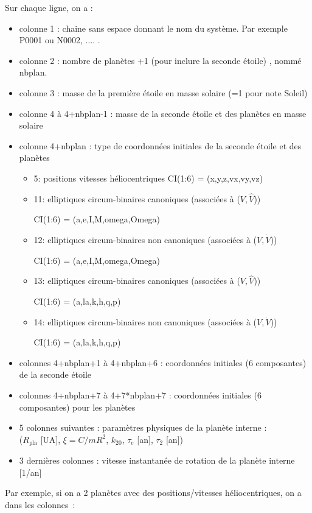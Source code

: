 \documentclass[11pt]{article}
\begin{document}
Sur chaque ligne, on a :
\begin{itemize}
\item colonne 1 : chaine sans espace donnant le nom du syst\`eme. Par exemple P0001 ou N0002, .... .
\item colonne 2 : nombre de plan\`etes +1 (pour inclure la seconde \'etoile) , nomm\'e nbplan.
\item colonne 3 : masse de la premi\`ere \'etoile en masse solaire (=1 pour note Soleil)
\item colonne 4 \`a 4+nbplan-1 : masse de la seconde \'etoile et des plan\`etes en masse solaire
\item colonne 4+nbplan : type de coordonn\'ees initiales de la seconde \'etoile et des plan\`etes
\begin{itemize}
\item 5:  positions vitesses h\'eliocentriques
	     CI(1:6) = (x,y,z,vx,vy,vz)
\item 11:  elliptiques circum-binaires canoniques (associ\'ees \`a ($V,\hat{V}$))

	     CI(1:6) = (a,e,I,M,omega,Omega)
\item 12:  elliptiques circum-binaires non canoniques (associ\'ees \`a ($V,\dot{V}$))

	     CI(1:6) = (a,e,I,M,omega,Omega)
\item 13:  elliptiques circum-binaires canoniques (associ\'ees \`a ($V,\hat{V}$))

	     CI(1:6) = (a,la,k,h,q,p)
\item 14:  elliptiques circum-binaires non canoniques (associ\'ees \`a ($V,\dot{V}$))

	     CI(1:6) = (a,la,k,h,q,p)
\end{itemize}

\item colonnes 4+nbplan+1 \`a  4+nbplan+6 :   coordonn\'ees initiales (6 composantes) de la seconde \'etoile
\item colonnes 4+nbplan+7 \`a 4+7*nbplan+7 :   coordonn\'ees initiales (6 composantes) pour les plan\`etes 
\item 5 colonnes suivantes : param\`etres physiques de la plan\`ete interne : \\
 ($R_\mathrm{pla}$ [UA], $\xi=C/mR^2$, $k_{20}$, $\tau_e$ [an], $\tau_2$ [an])
\item 3 derni\`eres colonnes : vitesse instantan\'ee de rotation de la plan\`ete interne [1/an]
\end{itemize}

 Par exemple, si on a 2 plan\`etes avec des positions/vitesses h\'eliocentriques, on a dans les colonnes~:
 
\end{document}
